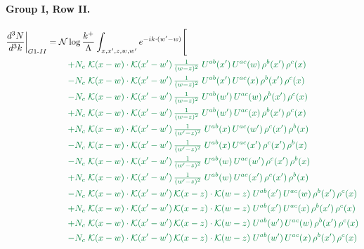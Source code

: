 \documentclass[10pt]{article}
\numberwithin{equation}{section}
\newcommand{\NN}{\mathcal N\log\frac{k^+}{\Lambda}}
\begin{document}
\paragraph{Group I, Row II.}
\begin{align}
\frac{d^3N}{d^3k}\bigg|_{G1\text{-}II}={}&\NN\int_{x,x',z,w,w'}e^{-ik\cdot(w'-w)}\Bigg[\notag\\
&\quad{\color{JIM}+N_c\;\mathcal{K}(x-w)\cdot\mathcal{K}(x'-w')\,\tfrac{1}{(w-z)^{2}}\;U^{ab}(x')\,U^{ac}(w)\,\rho^{b}(x')\,\rho^{c}(x)}\notag\\
&\quad{\color{JIM}-N_c\;\mathcal{K}(x-w)\cdot\mathcal{K}(x'-w')\,\tfrac{1}{(w-z)^{2}}\;U^{ab}(x')\,U^{ac}(x)\,\rho^{b}(x')\,\rho^{c}(x)}\notag\\
&\quad{\color{JIM}-N_c\;\mathcal{K}(x-w)\cdot\mathcal{K}(x'-w')\,\tfrac{1}{(w-z)^{2}}\;U^{ab}(w')\,U^{ac}(w)\,\rho^{b}(x')\,\rho^{c}(x)}\notag\\
&\quad{\color{JIM}+N_c\;\mathcal{K}(x-w)\cdot\mathcal{K}(x'-w')\,\tfrac{1}{(w-z)^{2}}\;U^{ab}(w')\,U^{ac}(x)\,\rho^{b}(x')\,\rho^{c}(x)}\notag\\
&\quad{\color{JIM}+N_c\;\mathcal{K}(x-w)\cdot\mathcal{K}(x'-w')\,\tfrac{1}{(w'-z)^{2}}\;U^{ab}(x)\,U^{ac}(w')\,\rho^{c}(x')\,\rho^{b}(x)}\notag\\
&\quad{\color{JIM}-N_c\;\mathcal{K}(x-w)\cdot\mathcal{K}(x'-w')\,\tfrac{1}{(w'-z)^{2}}\;U^{ab}(x)\,U^{ac}(x')\,\rho^{c}(x')\,\rho^{b}(x)}\notag\\
&\quad{\color{JIM}-N_c\;\mathcal{K}(x-w)\cdot\mathcal{K}(x'-w')\,\tfrac{1}{(w'-z)^{2}}\;U^{ab}(w)\,U^{ac}(w')\,\rho^{c}(x')\,\rho^{b}(x)}\notag\\
&\quad{\color{JIM}+N_c\;\mathcal{K}(x-w)\cdot\mathcal{K}(x'-w')\,\tfrac{1}{(w'-z)^{2}}\;U^{ab}(w)\,U^{ac}(x')\,\rho^{c}(x')\,\rho^{b}(x)}\notag\\
&\quad{\color{JIM}-N_c\;\mathcal{K}(x-w)\cdot\mathcal{K}(x'-w')\,\mathcal{K}(x-z)\cdot\mathcal{K}(w-z)\;U^{ab}(x')\,U^{ac}(w)\,\rho^{b}(x')\,\rho^{c}(x)}\notag\\
&\quad{\color{JIM}+N_c\;\mathcal{K}(x-w)\cdot\mathcal{K}(x'-w')\,\mathcal{K}(x-z)\cdot\mathcal{K}(w-z)\;U^{ab}(x')\,U^{ac}(x)\,\rho^{b}(x')\,\rho^{c}(x)}\notag\\
&\quad{\color{JIM}+N_c\;\mathcal{K}(x-w)\cdot\mathcal{K}(x'-w')\,\mathcal{K}(x-z)\cdot\mathcal{K}(w-z)\;U^{ab}(w')\,U^{ac}(w)\,\rho^{b}(x')\,\rho^{c}(x)}\notag\\
&\quad{\color{JIM}-N_c\;\mathcal{K}(x-w)\cdot\mathcal{K}(x'-w')\,\mathcal{K}(x-z)\cdot\mathcal{K}(w-z)\;U^{ab}(w')\,U^{ac}(x)\,\rho^{b}(x')\,\rho^{c}(x)}\notag\\

\end{align}
\end{document}
